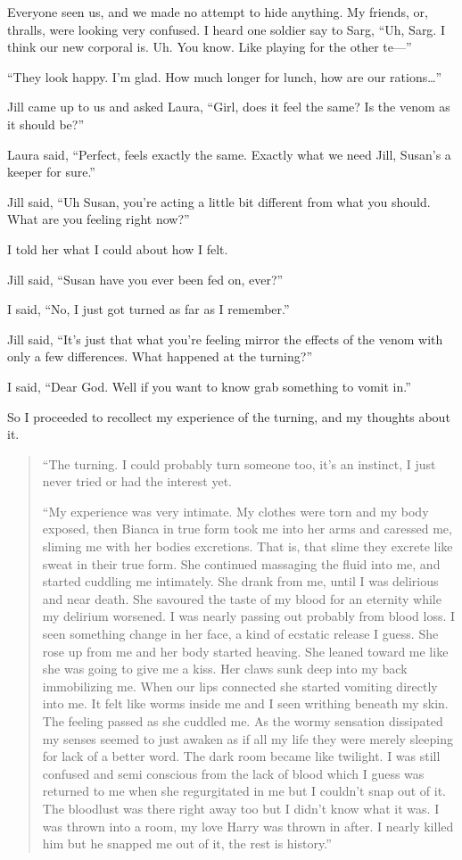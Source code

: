 Everyone seen us, and we made no attempt to hide anything. My friends, or, thralls, were looking very confused. I heard one soldier say to Sarg, ``Uh, Sarg. I think our new corporal is. Uh. You know. Like playing for the other te---''

``They look happy. I'm glad. How much longer for lunch, how are our rations\dots{}''

Jill came up to us and asked Laura, ``Girl, does it feel the same? Is the venom as it should be?''

Laura said, ``Perfect, feels exactly the same. Exactly what we need Jill, Susan's a keeper for sure.''

Jill said, ``Uh Susan, you're acting a little bit different from what you should. What are you feeling right now?''

I told her what I could about how I felt.

Jill said, ``Susan have you ever been fed on, ever?''

I said, ``No, I just got turned as far as I remember.''

Jill said, ``It's just that what you're feeling mirror the effects of the venom with only a few differences. What happened at the turning?''

I said, ``Dear God. Well if you want to know grab something to vomit in.''

So I proceeded to recollect my experience of the turning, and my thoughts about it.

\begin{quote}
		``The turning. I could probably turn someone too, it's an instinct, I just never tried or had the interest yet. 
	
	``My experience was very intimate. My clothes were torn and my body exposed, then Bianca in true form took me into her arms and caressed me, sliming me with her bodies excretions. That is, that slime they excrete like sweat in their true form. She continued massaging the fluid into me, and started cuddling me intimately. She drank from me, until I was delirious and near death. She savoured the taste of my blood for an eternity while my delirium worsened. I was nearly passing out probably from blood loss. I seen something change in her face, a kind of ecstatic release I guess. She rose up from me and her body started heaving. She leaned toward me like she was going to give me a kiss. Her claws sunk deep into my back immobilizing me. When our lips connected she started vomiting directly into me. It felt like worms inside me and I seen writhing beneath my skin. The feeling passed as she cuddled me. As the wormy sensation dissipated my senses seemed to just awaken as if all my life they were merely sleeping for lack of a better word. The dark room became like twilight. I was still confused and semi conscious from the lack of blood which I guess was returned to me when she regurgitated in me but I couldn't snap out of it. The bloodlust was there right away too but I didn't know what it was. I was thrown into a room, my love Harry was thrown in after. I nearly killed him but he snapped me out of it, the rest is history.''

\end{quote}	

